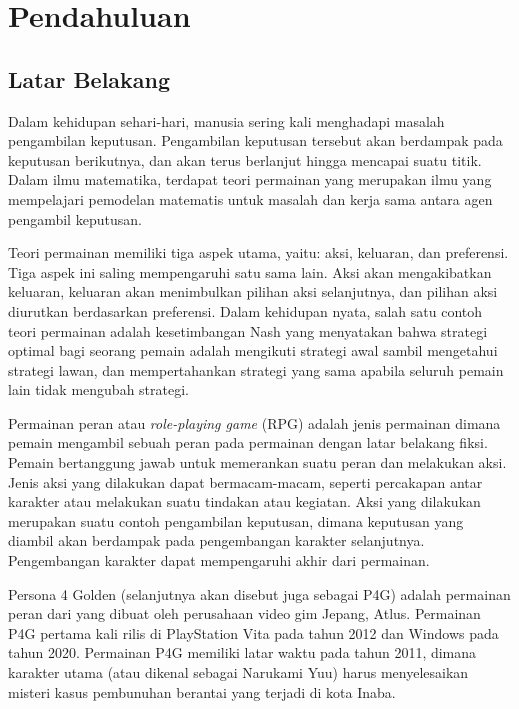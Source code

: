\chapter{Pendahuluan}

\section{Latar Belakang}
\label{sec:latarbelakang}

Dalam kehidupan sehari-hari, manusia sering kali menghadapi masalah pengambilan keputusan. Pengambilan keputusan tersebut akan berdampak pada keputusan berikutnya, dan akan terus berlanjut hingga mencapai suatu titik. Dalam ilmu matematika, terdapat teori permainan yang merupakan ilmu yang mempelajari pemodelan matematis untuk masalah dan kerja sama antara agen pengambil keputusan.

Teori permainan memiliki tiga aspek utama, yaitu: aksi, keluaran, dan preferensi. Tiga aspek ini saling mempengaruhi satu sama lain. Aksi akan mengakibatkan keluaran, keluaran akan menimbulkan pilihan aksi selanjutnya, dan pilihan aksi diurutkan berdasarkan preferensi. Dalam kehidupan nyata, salah satu contoh teori permainan adalah kesetimbangan Nash yang menyatakan bahwa strategi optimal bagi seorang pemain adalah mengikuti strategi awal sambil mengetahui strategi lawan, dan mempertahankan strategi yang sama apabila seluruh pemain lain tidak mengubah strategi.

Permainan peran atau \textit{role-playing game} (RPG) adalah jenis permainan dimana pemain mengambil sebuah peran pada permainan dengan latar belakang fiksi. Pemain bertanggung jawab untuk memerankan suatu peran dan melakukan aksi. Jenis aksi yang dilakukan dapat bermacam-macam, seperti percakapan antar karakter atau melakukan suatu tindakan atau kegiatan. Aksi yang dilakukan merupakan suatu contoh pengambilan keputusan, dimana keputusan yang diambil akan berdampak pada pengembangan karakter selanjutnya. Pengembangan karakter dapat mempengaruhi akhir dari permainan.

Persona 4 Golden (selanjutnya akan disebut juga sebagai P4G) adalah permainan peran dari yang dibuat oleh perusahaan video gim Jepang, Atlus. Permainan P4G pertama kali rilis di PlayStation Vita pada tahun 2012 dan Windows pada tahun 2020. Permainan P4G memiliki latar waktu pada tahun 2011, dimana karakter utama (atau dikenal sebagai Narukami Yuu) harus menyelesaikan misteri kasus pembunuhan berantai yang terjadi di kota Inaba.


